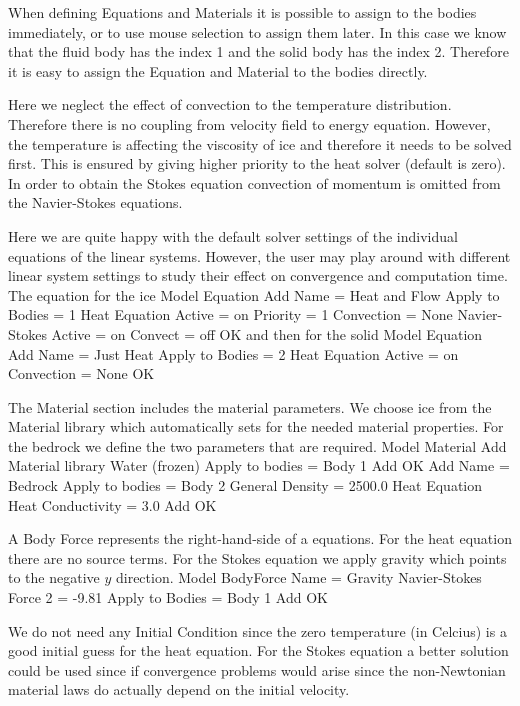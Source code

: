 When defining Equations and Materials it is possible to assign to the bodies immediately, or to use mouse
selection to assign them later. In this case we know that the fluid body has the index 1 and the 
solid body has the index 2. Therefore it is easy to assign the Equation and Material to the bodies directly. 

Here we neglect the effect of convection to the temperature distribution. Therefore there is no coupling 
from velocity field to energy equation. However, the temperature is affecting the viscosity of ice and therefore
it needs to be solved first. This is ensured by giving higher priority to the heat solver
(default is zero). In order to obtain the Stokes equation convection of momentum is omitted 
from the Navier-Stokes equations.	

Here we are quite happy with the default solver settings of the individual equations of the linear systems.
However, the user may play around with different linear system settings to study their effect on 
convergence and computation time.
\\
The equation for the ice
\ttbegin
Model
  Equation
    Add
    Name = Heat and Flow
    Apply to Bodies = 1
    Heat Equation
      Active = on
      Priority = 1
      Convection = None
    Navier-Stokes 
      Active = on
      Convect = off
    OK
\ttend        
and then for the solid
\ttbegin
Model
  Equation
    Add
    Name = Just Heat
    Apply to Bodies = 2
    Heat Equation
      Active = on
      Convection = None
    OK
\ttend    

The Material section includes the material parameters.
We choose ice from the Material library which automatically sets for the needed material properties. 
For the bedrock we define the two parameters that are required. 
\ttbegin
Model
  Material
    Add 
      Material library
        Water (frozen)
      Apply to bodies = Body 1 
      Add 
      OK
    Add
      Name = Bedrock
      Apply to bodies = Body 2
      General    
        Density = 2500.0
      Heat Equation
        Heat Conductivity = 3.0
      Add
      OK
\ttend


A Body Force represents the right-hand-side of a equations. For the heat equation there are
no source terms. For the Stokes equation we apply gravity which
points to the negative $y$ direction.
\ttbegin
Model
  BodyForce
    Name = Gravity
    Navier-Stokes
      Force 2 = -9.81
    Apply to Bodies = Body 1 
    Add
    OK
\ttend

We do not need any Initial Condition since the zero temperature (in Celcius) is a good initial
guess for the heat equation. For the Stokes equation a better solution could be used since 
if convergence problems would arise since the non-Newtonian material laws do actually depend on the 
initial velocity.

